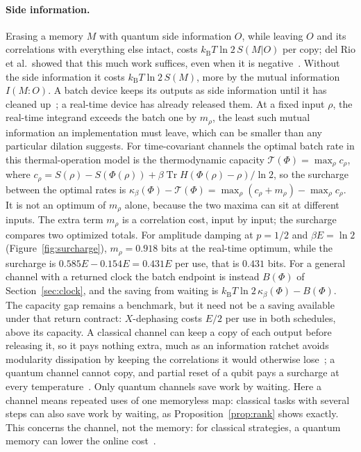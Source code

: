 \documentclass[11pt]{article}
\theoremstyle{definition}
\theoremstyle{remark}
\newcommand{\Tr}{\operatorname{Tr}}
\newcommand{\kB}{k_{\mathrm B}}
\newcommand{\Trt}{\kappa_\beta}
\begin{document}
\paragraph{Side information.} Erasing a memory $M$ with quantum side information $O$, while leaving $O$ and its correlations with everything else intact, costs $\kB T\ln2\,S(M|O)$ per copy; del Rio et al.\ showed that this much work suffices, even when it is negative~\cite{delRio11}. Without the side information it costs $\kB T\ln2\,S(M)$, more by the mutual information $I(M{:}O)$. A batch device keeps its outputs as side information until it has cleaned up~\cite[Sec.~7]{FBB21}; a real-time device has already released them. At a fixed input $\rho$, the real-time integrand exceeds the batch one by $m_\rho$, the least such mutual information an implementation must leave, which can be smaller than any particular dilation suggests. For time-covariant channels the optimal batch rate in this thermal-operation model is the thermodynamic capacity $\mathcal T(\Phi)=\max_\rho c_\rho$, where $c_\rho=S(\rho)-S(\Phi(\rho))+\beta\Tr H(\Phi(\rho)-\rho)/\ln2$, so the surcharge between the optimal rates is $\Trt(\Phi)-\mathcal T(\Phi)=\max_\rho(c_\rho+m_\rho)-\max_\rho c_\rho$. It is not an optimum of $m_\rho$ alone, because the two maxima can sit at different inputs. The extra term $m_\rho$ is a correlation cost, input by input; the surcharge compares two optimized totals. For amplitude damping at $p=1/2$ and $\beta E=\ln2$ (Figure~\ref{fig:surcharge}), $m_\rho=0.918$ bits at the real-time optimum, while the surcharge is $0.585E-0.154E=0.431E$ per use, that is $0.431$ bits. For a general channel with a returned clock the batch endpoint is instead $B(\Phi)$ of Section~\ref{sec:clock}, and the saving from waiting is $\kB T\ln2\,\Trt(\Phi)-B(\Phi)$. The capacity gap remains a benchmark, but it need not be a saving available under that return contract: $X$-dephasing costs $E/2$ per use in both schedules, above its capacity. A classical channel can keep a copy of each output before releasing it, so it pays nothing extra, much as an information ratchet avoids modularity dissipation by keeping the correlations it would otherwise lose~\cite{BMC18}; a quantum channel cannot copy, and partial reset of a qubit pays a surcharge at every temperature~\cite{SaveWork}. Only quantum channels save work by waiting. Here a channel means repeated uses of one memoryless map: classical tasks with several steps can also save work by waiting, as Proposition~\ref{prop:rank} shows exactly. This concerns the channel, not the memory: for classical strategies, a quantum memory can lower the online cost~\cite{Thompson25}.
\end{document}
